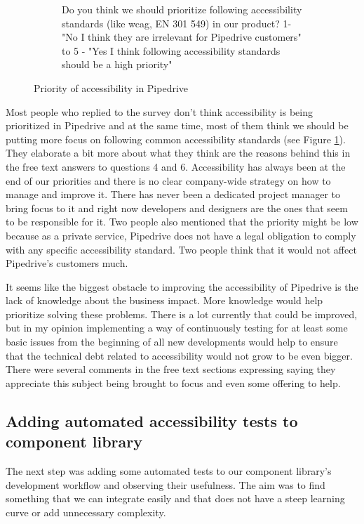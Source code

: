 \documentclass{master_thesis}
\begin{document}
\begin{figure}[H]
\begin{subfigure}{0.45\textwidth}
		\caption{Do you think we should prioritize following accessibility standards (like \ac{wcag}, EN 301 549) in our product? 1- "No I think they are irrelevant for Pipedrive customers" to 5 - "Yes I think following accessibility standards should be a high priority" }
	\end{subfigure}
	\caption{Priority of accessibility in Pipedrive}
    \label{fig:a11y-priority}
\end{figure}

Most people who replied to the survey don't think accessibility is being prioritized in Pipedrive and at the same time, most of them think we should be putting more focus on following common accessibility standards (see Figure \ref{fig:a11y-priority}). They elaborate a bit more about what they think are the reasons behind this in the free text answers to questions 4 and 6. Accessibility has always been at the end of our priorities and there is no clear company-wide strategy on how to manage and improve it. There has never been a dedicated project manager to bring focus to it
and right now developers and designers are the ones that seem to be responsible for it. Two people also mentioned that the priority might be low because as a private service, Pipedrive does not have a legal obligation to comply with any specific accessibility standard. Two people think that it would not affect Pipedrive's customers much.

It seems like the biggest obstacle to improving the accessibility of Pipedrive is the lack of knowledge about the business impact. More knowledge would help prioritize solving these problems. There is a lot currently that could be improved, but in my opinion implementing a way of continuously testing for at least some basic issues from the beginning of all new developments would help to ensure that the technical debt related to accessibility would not grow to be even bigger. There were several comments in the free text sections expressing saying they appreciate this subject being brought to focus and even some offering to help.

\subsection{Adding automated accessibility tests to component library} \label{adding-a11y-tool}
The next step was adding some automated tests to our component library's development workflow and observing their usefulness. The aim was to find something that we can integrate easily and that does not have a steep learning curve or add unnecessary complexity.
\end{document}
